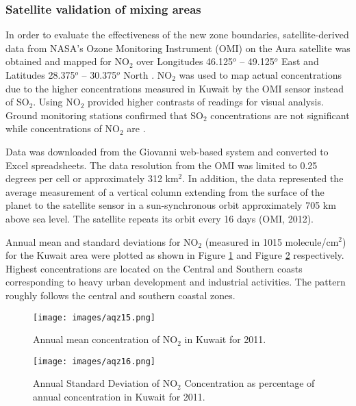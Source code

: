 \subsubsection{Satellite validation of mixing areas}

In order to evaluate the effectiveness of the new zone boundaries, satellite-derived data from NASA’s Ozone Monitoring Instrument (OMI) on the Aura satellite was obtained and mapped for NO$_{2}$ over Longitudes 46.125$^{o}$ – 49.125$^{o}$ East and Latitudes 28.375$^{o}$ – 30.375$^{o}$ North \citep{Boersma2011, Strawa2013}.  NO$_{2}$ was used to map actual concentrations due to the higher concentrations measured in Kuwait by the OMI sensor instead of SO$_{2}$.  Using  NO$_{2}$ provided higher contrasts of readings for visual analysis. Ground monitoring stations confirmed that SO$_{2}$ concentrations are not significant while concentrations of NO$_{2}$ are \citep{Al-Awadhi2014}.

Data was downloaded from the Giovanni web-based system \citep{Acker2007} and converted to Excel spreadsheets.  The data resolution from the OMI was limited to 0.25 degrees per cell or approximately 312 km$^{2}$.  In addition, the data represented the average measurement of a vertical column extending from the surface of the planet to the satellite sensor in a sun-synchronous orbit approximately 705 km above sea level.  The satellite repeats its orbit every 16 days (OMI, 2012). 

Annual mean and standard deviations for NO$_{2}$ (measured in 1015 molecule/cm$^{2}$) for the Kuwait area were plotted as shown in Figure \ref{fig:15meanNO2} and Figure \ref{fig:16stdNO2} respectively.  Highest concentrations are located on the Central and Southern coasts corresponding to heavy urban development and industrial activities. The pattern roughly follows the central and southern coastal zones.

%
\begin{figure}[H]
\texttt{[image: images/aqz15.png]} 
\caption{Annual mean concentration of NO$_{2}$ in Kuwait for 2011.}
\label{fig:15meanNO2}
\end{figure}
%
%
\begin{figure}[H]
\texttt{[image: images/aqz16.png]} 
\caption[Annual Standard Deviation of NO$_{2}$ Concentration]{Annual Standard Deviation of NO$_{2}$ Concentration as percentage of annual concentration in Kuwait for 2011.}
\label{fig:16stdNO2}
\end{figure}
%

